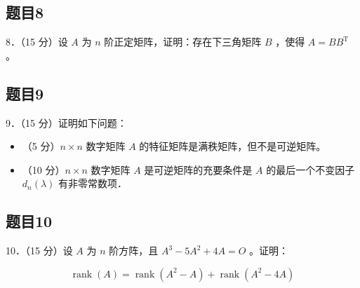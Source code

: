 \documentclass{article}
\begin{document}
\subsection{题目8}
8．（15 分）设 \(A\) 为 \(n\) 阶正定矩阵，证明：存在下三角矩阵 \(B\) ，使得 \(A=B B^{\mathrm{T}}\) 。

\subsection{题目9}
9．（15 分）证明如下问题：

\begin{itemize}
  \item[（1）] （5 分）\(n \times n\) 数字矩阵 \(A\) 的特征矩阵是满秩矩阵，但不是可逆矩阵。
  \item[（2）] （10 分）\(n \times n\) 数字矩阵 \(A\) 是可逆矩阵的充要条件是 \(A\) 的最后一个不变因子 \(d_{n}(\lambda)\) 有非零常数项．
\end{itemize}

\subsection{题目10}
10．（15 分）设 \(A\) 为 \(n\) 阶方阵，且 \(A^{3}-5 A^{2}+4 A=O\) 。证明：

\[
\operatorname{rank}(A)=\operatorname{rank}\left(A^{2}-A\right)+\operatorname{rank}\left(A^{2}-4 A\right)
\]
\end{document}
